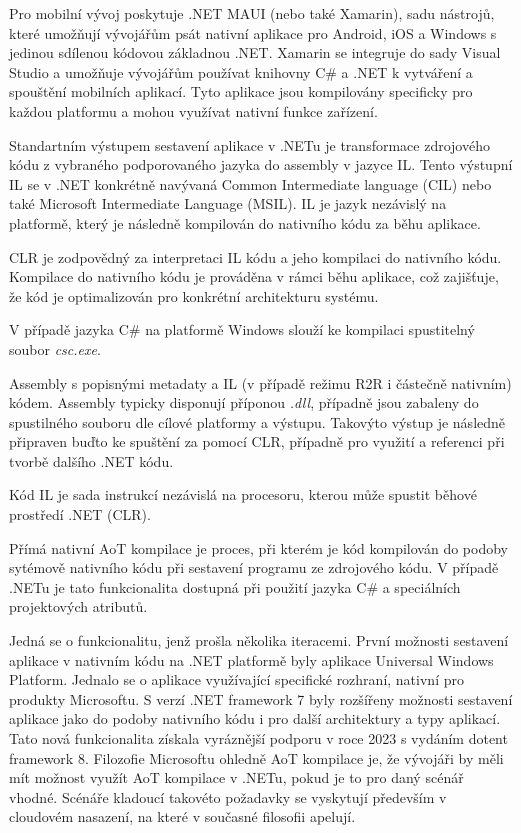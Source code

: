
Pro mobilní vývoj poskytuje .NET MAUI (nebo také Xamarin), sadu nástrojů, které umožňují vývojářům psát nativní aplikace pro Android, iOS a Windows s jedinou sdílenou kódovou základnou .NET. Xamarin se integruje do sady Visual Studio a umožňuje vývojářům používat knihovny C\# a .NET k vytváření a spouštění mobilních aplikací. Tyto aplikace jsou kompilovány specificky pro každou platformu a mohou využívat nativní funkce zařízení.


Standartním výstupem sestavení aplikace v .NETu je transformace zdrojového kódu z vybraného podporovaného jazyka do assembly v jazyce IL. Tento výstupní IL se v .NET konkrétně navývaná Common Intermediate language (CIL) nebo také Microsoft Intermediate Language (MSIL). IL je jazyk nezávislý na platformě, který je následně kompilován do nativního kódu za běhu aplikace.

CLR je zodpovědný za interpretaci IL kódu a jeho kompilaci do nativního kódu. Kompilace do nativního kódu je prováděna v rámci běhu aplikace, což zajišťuje, že kód je optimalizován pro konkrétní architekturu systému.

V případě jazyka C\# na platformě Windows slouží ke kompilaci spustitelný soubor \emph{csc.exe}. 


Assembly s popisnými metadaty a IL (v případě režimu R2R i částečně nativním) kódem. Assembly typicky disponují příponou \emph{.dll}, případně jsou zabaleny do spustilného souboru dle cílové platformy a výstupu. Takovýto výstup je následně připraven buďto ke spuštění za pomocí CLR, případně pro využití a referenci při tvorbě dalšího .NET kódu.

Kód IL je sada instrukcí nezávislá na procesoru, kterou může spustit běhové prostředí .NET (CLR).


Přímá nativní AoT kompilace je proces, při kterém je kód kompilován do podoby sytémově nativního kódu při sestavení programu ze zdrojového kódu. V případě .NETu je tato funkcionalita dostupná při použití jazyka C\# a speciálních projektových atributů. 

Jedná se o funkcionalitu, jenž prošla několika iteracemi. První možnosti sestavení aplikace v nativním kódu na .NET platformě byly aplikace Universal Windows Platform. Jednalo se o aplikace využívající specifické rozhraní, nativní pro produkty Microsoftu. S verzí .NET framework 7 byly rozšířeny možnosti sestavení aplikace jako do podoby nativního kódu i pro další architektury a typy aplikací. Tato nová funkcionalita získala vyráznější podporu v roce 2023 s vydáním dotent framework 8. Filozofie Microsoftu ohledně AoT kompilace je, že vývojáři by měli mít možnost využít AoT kompilace v .NETu, pokud je to pro daný scénář vhodné. Scénáře kladoucí takovéto požadavky se vyskytují především v cloudovém nasazení, na které v současné filosofii apelují. 

